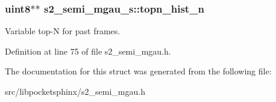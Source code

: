 \subsubsection[{topn\-\_\-hist\-\_\-n}]{\setlength{\rightskip}{0pt plus 5cm}uint8$\ast$$\ast$ s2\-\_\-semi\-\_\-mgau\-\_\-s\-::topn\-\_\-hist\-\_\-n}\label{structs2__semi__mgau__s_acfe1e5d43a25418ef19afba837f85cf7}


Variable top-\/\-N for past frames. 



Definition at line 75 of file s2\-\_\-semi\-\_\-mgau.\-h.



The documentation for this struct was generated from the following file\-:\begin{DoxyCompactItemize}
\item 
src/libpocketsphinx/s2\-\_\-semi\-\_\-mgau.\-h\end{DoxyCompactItemize}
